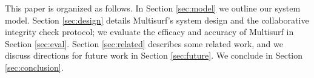 This paper is organized as follows. In Section \ref{sec:model} we outline our system model. Section \ref{sec:design} details Multisurf's system design and the collaborative integrity check protocol; we evaluate the efficacy and accuracy of Multisurf in Section \ref{sec:eval}. Section \ref{sec:related} describes some related work, and we discuss directions for future work in Section \ref{sec:future}. We conclude in Section \ref{sec:conclusion}.
